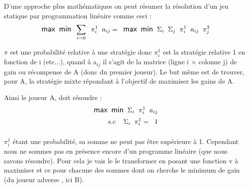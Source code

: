 \documentclass[a4paper, 12pt, twoside]{article}
\begin{document}
{{D'une approche plus mathématiques on peut résumer la résolution d'un \textsf{jeu statique} par \textsf{programmation linéaire} comme ceci : \newline
\begin{align*}
\large \textsf{max} \hspace{0,2 cm} \textsf{min} \hspace{0,2 cm} \sum_{i=0}\hspace{0,2 cm} \pi_{i}^{1}\hspace{0,2 cm} a _{ij}  =\hspace{0,2 cm} \textsf{max} \hspace{0,2 cm} \textsf{min} \hspace{0,2 cm}\Sigma _{i}\hspace{0,2 cm} \Sigma _{j}\hspace{0,2 cm} \pi_{i}^{1}\hspace{0,2 cm} a _{ij} \hspace{0,2 cm} \pi_{j}^{2} 
\end{align*}

$ \pi $ est une probabilité relative à une stratégie donc $\pi_{i}^{1}$ est la stratégie relative 1 en fonction de i (etc...), quand à a$ _{ij} $ il s'agit de la matrice (ligne \textsf{i} $\times$ colonne \textsf{j}) de gain ou récompense de A (donc du premier joueur).  Le but même est de trouver, pour A, la stratégie mixte répondant à l'objectif de maximiser les gains de A. \newline

Ainsi le joueur A, doit résoudre :
\begin{align*}
\large {\textsf{max} \hspace{0.2 cm} \textsf{min} \hspace{0.2 cm} \Sigma_{i}\hspace{0.2 cm} \pi_{i}^{1}\hspace{0.2 cm} a _{ij} } \\ s.c \hspace{0,4 cm}
\large {\Sigma_{i}\hspace{0,2 cm}\pi_{i}^{1} = \hspace{0,2 cm}1}
\end{align*}
\paragraph*{}{$\pi_{i}^{1}$ étant une probabilité, sa somme ne peut pas être supérieure à 1. Cependant nous ne sommes pas en présence encore d'un programme linéaire (que nous savons résoudre). Pour cela je vais le  le transformer  en posant une fonction  \textsf{v} à maximiser et ce pour chacune des sommes dont on cherche le minimum de gain (du joueur adverse , ici B)}. \newline 

}}
\end{document}
